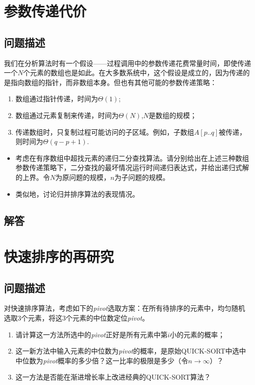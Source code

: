 \documentclass{article}
\begin{document}
\section{参数传递代价}

\subsection{问题描述}

我们在分析算法时有一个假设——过程调用中的参数传递花费常量时间，即使传递一个$N$个元素的数组也是如此。在大多数系统中，这个假设是成立的，因为传递的是指向数组的指针，而非数组本身。但也有其他可能的参数传递策略：

\begin{enumerate}
    \item 数组通过指针传递，时间为$\Theta(1)$;
    \item 数组通过元素复制来传递，时间为$\Theta(N)$,$N$是数组的规模；
    \item 传递数组时，只复制过程可能访问的子区域。例如，子数组$A[p..q]$被传递，则时间为$\Theta(q-p+1)$.
\end{enumerate}

\begin{itemize}
    \item 考虑在有序数组中超找元素的递归二分查找算法。请分别给出在上述三种数组参数传递策略下，二分查找的最坏情况运行时间递归表达式，并给出递归式解的上界。令$N$为原问题的规模，$n$为子问题的规模。
    \item 类似地，讨论归并排序算法的表现情况。
\end{itemize}

\subsection{解答}
\section{快速排序的再研究}

\subsection{问题描述}

对快速排序算法，考虑如下的\textit{pivot}选取方案：在所有待排序的元素中，均匀随机选取3个元素，将这3个元素的中位数定位\textit{pivot}。

\begin{enumerate}
    \item 请计算这一方法所选中的\textit{pivot}正好是所有元素中第$i$小的元素的概率；
    \item 这一新方法中输入元素的中位数为\textit{pivot}的概率，是原始QUICK-SORT中选中中位数为\textit{pivot}概率的多少倍？这一比率的极限是多少（令$n\rightarrow \infty$）？
    \item 这一方法是否能在渐进增长率上改进经典的QUICK-SORT算法？
\end{enumerate}
\end{document}
